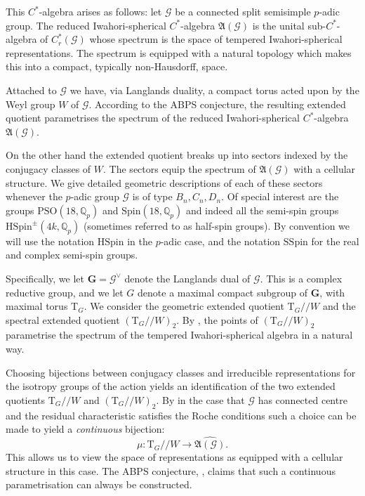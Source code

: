 \documentclass[11pt,a4paper]{article}
\def\SSpin{\mathrm{SSpin}}
\def\HSpin{\mathrm{HSpin}}
\def\Spin{\mathrm{Spin}}
\def\PSO{\mathrm{PSO}}
\def\SSpin{\mathrm{SSpin}}
\def\fA{\mathfrak{A}}
\def\Q{\mathbb{Q}}
\def\fA{\mathfrak{A}}
\def\q {{/\!/}}
\def\bT{\mathrm{T}}
\def\G{\mathcal{G}}
\def\bG{\mathbf{G}}
\begin{document}
This $C^*$-algebra arises as follows:  let $\G$ be a connected split semisimple $p$-adic group.
The reduced Iwahori-spherical $C^*$-algebra $\fA(\G)$ is the unital sub-$C^*$-algebra of $C^*_r(\G)$ whose spectrum is the space of tempered Iwahori-spherical representations. The spectrum is equipped with a natural topology which makes this into a compact, typically non-Hausdorff, space.

Attached to $\G$ we have, via Langlands duality, a compact torus acted upon by the Weyl group $W$ of  $\G$.   According to the ABPS conjecture, the resulting extended quotient parametrises the spectrum of the reduced Iwahori-spherical $C^*$-algebra $\fA(\G)$. 

On the other hand the extended quotient breaks up into sectors indexed by the conjugacy classes of $W$.  The sectors equip the spectrum of $\fA(\G)$ with a cellular structure. We give detailed geometric descriptions of  each of these sectors whenever the $p$-adic group $\G$ is of type $B_n, C_n, D_n$.     Of special interest are the groups $\PSO(18, \Q_p)$ and $\Spin(18,\Q_p)$ and indeed all the semi-spin groups $\HSpin^\pm(4k,\Q_p)$ (sometimes referred to as half-spin groups). By convention we will use the notation $\HSpin$ in the $p$-adic case, and the notation $\SSpin$ for the real and complex semi-spin groups.




\bigskip

Specifically, we let $\bG = \G^\vee$ denote the Langlands dual of $\G$. This is a complex reductive group, and we let $G$ denote a maximal compact subgroup of $\bG$, with maximal torus $\bT_G$.
We consider the geometric extended quotient $\bT_G\q W$ and the spectral extended quotient $(\bT_G\q W)_2$. By \cite[Theorem 15.1]{ABPS3}, the points of $(\bT_G\q W)_2$ parametrise the spectrum of the tempered Iwahori-spherical algebra in a natural way. 







Choosing bijections between conjugacy classes and irreducible representations for the isotropy groups of the action yields an identification of the two extended quotients $\bT_G\q W$ and $(\bT_G\q W)_2$. By \cite[Theorem 5.2]{ABPS} in the case that $\G$ has connected centre and the residual characteristic satisfies the Roche conditions \cite{Roche} such a choice can be made to yield a \emph{continuous} bijection:
\[
\mu:\bT_G\q W
\to \widehat{\fA(\G)}.
\]
This allows us to view the space of representations as equipped with a cellular structure in this case. The ABPS conjecture, \cite[Section 15]{ABPS-smooth-dual}, claims that such a continuous parametrisation can always be constructed.
\end{document}
